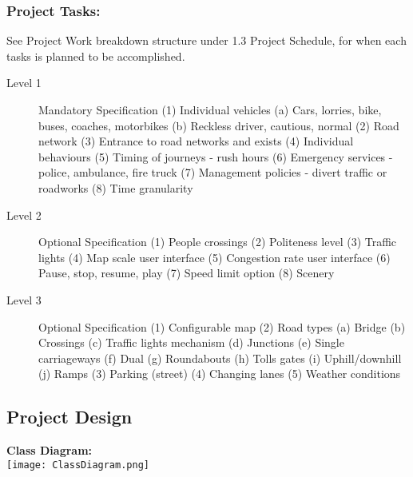 \documentclass{article} \usepackage{graphicx}
\begin{document}
			\subsubsection{Project Tasks:} 					
			See Project Work breakdown structure under 1.3 Project Schedule, for when each tasks is planned to be accomplished.
            \begin{description} 				
                \item[Level 1] Mandatory Specification
                        (1) Individual vehicles
                                (a) Cars, lorries, bike, buses, coaches, motorbikes 					
                                (b) Reckless driver, cautious, normal 								
                        (2) Road network
                        (3) Entrance to road networks and exists
                        (4) Individual behaviours
                        (5) Timing of journeys - rush hours
                        (6) Emergency services - police, ambulance, fire truck
                        (7) Management policies - divert traffic or roadworks
                        (8) Time granularity 							
                  \item[Level 2] Optional Specification
                            (1) People crossings
                            (2) Politeness level
                            (3) Traffic lights
                            (4) Map scale user interface
                            (5) Congestion rate user interface
                            (6) Pause, stop, resume, play
                            (7) Speed limit option
                            (8) Scenery
                  \item[Level 3] Optional Specification
                        (1) Configurable map
                        (2) Road types
                            (a) Bridge
                            (b) Crossings
                            (c) Traffic lights mechanism
                            (d) Junctions
                            (e) Single carriageways
                            (f) Dual
                            (g) Roundabouts
                            (h) Tolls gates
                            (i) Uphill/downhill
                            (j) Ramps
                        (3) Parking (street)
                        (4) Changing lanes
                        (5) Weather conditions
                \end{description}


                \subsection{Project Design}
                \textbf{Class Diagram:}\\
                \texttt{[image: ClassDiagram.png]}
				  
\end{document}

